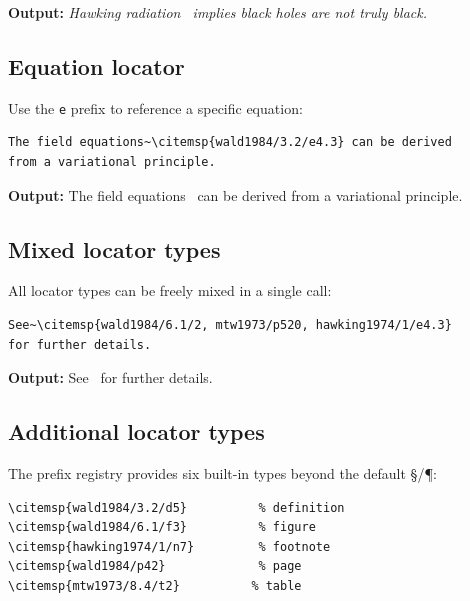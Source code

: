 \documentclass[11pt, a4paper]{article}
\begin{document}
\noindent\textbf{Output:} \textit{Hawking radiation~ implies black holes are not truly black.}


\subsection{Equation locator}

Use the \texttt{e} prefix to reference a specific equation:

\begin{tcolorbox}[colback=blue!3, colframe=blue!30, boxrule=0.5pt, arc=2pt, top=6pt, bottom=6pt, left=10pt, right=10pt]
\begin{verbatim}
The field equations~\citemsp{wald1984/3.2/e4.3} can be derived
from a variational principle.
\end{verbatim}
\end{tcolorbox}

\noindent\textbf{Output:} The field equations~ can be derived from a variational principle.



\subsection{Mixed locator types}

All locator types can be freely mixed in a single call:

\begin{tcolorbox}[colback=blue!3, colframe=blue!30, boxrule=0.5pt, arc=2pt, top=6pt, bottom=6pt, left=10pt, right=10pt]
\begin{verbatim}
See~\citemsp{wald1984/6.1/2, mtw1973/p520, hawking1974/1/e4.3}
for further details.
\end{verbatim}
\end{tcolorbox}

\noindent\textbf{Output:} See~ for further details.


\subsection{Additional locator types}

The prefix registry provides six built-in types beyond the default \S/\P:

\begin{tcolorbox}[colback=blue!3, colframe=blue!30, boxrule=0.5pt, arc=2pt, top=6pt, bottom=6pt, left=10pt, right=10pt]
\begin{verbatim}
\citemsp{wald1984/3.2/d5}          % definition
\citemsp{wald1984/6.1/f3}          % figure
\citemsp{hawking1974/1/n7}         % footnote
\citemsp{wald1984/p42}             % page
\citemsp{mtw1973/8.4/t2}          % table
\end{verbatim}
\end{tcolorbox}
\end{document}
